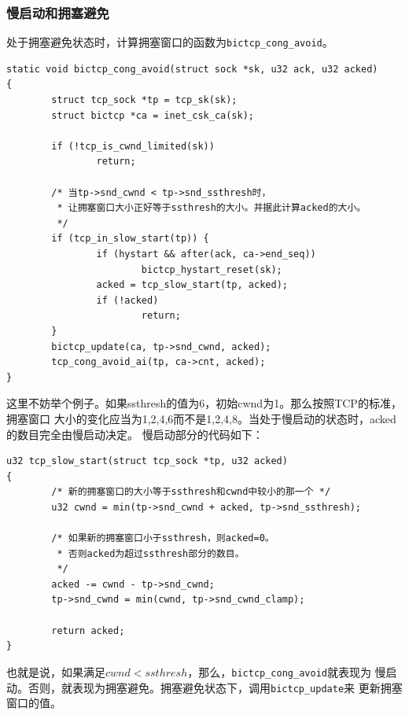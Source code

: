\subsubsection{慢启动和拥塞避免}
处于拥塞避免状态时，计算拥塞窗口的函数为\texttt{bictcp_cong_avoid}。
\begin{verbatim}
static void bictcp_cong_avoid(struct sock *sk, u32 ack, u32 acked)
{       
        struct tcp_sock *tp = tcp_sk(sk);
        struct bictcp *ca = inet_csk_ca(sk);
        
        if (!tcp_is_cwnd_limited(sk))
                return;
        
        /* 当tp->snd_cwnd < tp->snd_ssthresh时，
         * 让拥塞窗口大小正好等于ssthresh的大小。并据此计算acked的大小。
         */
        if (tcp_in_slow_start(tp)) {
                if (hystart && after(ack, ca->end_seq))
                        bictcp_hystart_reset(sk);
                acked = tcp_slow_start(tp, acked);
                if (!acked)
                        return;
        }
        bictcp_update(ca, tp->snd_cwnd, acked);
        tcp_cong_avoid_ai(tp, ca->cnt, acked);
}
\end{verbatim}
这里不妨举个例子。如果ssthresh的值为6，初始cwnd为1。那么按照TCP的标准，拥塞窗口
大小的变化应当为1,2,4,6而不是1,2,4,8。当处于慢启动的状态时，acked的数目完全由慢启动决定。
慢启动部分的代码如下：
\begin{verbatim}
u32 tcp_slow_start(struct tcp_sock *tp, u32 acked)
{
        /* 新的拥塞窗口的大小等于ssthresh和cwnd中较小的那一个 */
        u32 cwnd = min(tp->snd_cwnd + acked, tp->snd_ssthresh);

        /* 如果新的拥塞窗口小于ssthresh，则acked=0。
         * 否则acked为超过ssthresh部分的数目。 
         */
        acked -= cwnd - tp->snd_cwnd;
        tp->snd_cwnd = min(cwnd, tp->snd_cwnd_clamp);

        return acked;
}
\end{verbatim}
也就是说，如果满足$cwnd<ssthresh$，那么，\texttt{bictcp_cong_avoid}就表现为
慢启动。否则，就表现为拥塞避免。拥塞避免状态下，调用\texttt{bictcp_update}来
更新拥塞窗口的值。
